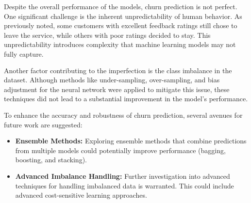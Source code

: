 \documentclass[12pt]{article}
\begin{document}
Despite the overall performance of the models, churn prediction is not perfect. One significant challenge is the inherent unpredictability of human behavior. As previously noted, some customers with excellent feedback ratings still chose to leave the service, while others with poor ratings decided to stay. This unpredictability introduces complexity that machine learning models may not fully capture.

Another factor contributing to the imperfection is the class imbalance in the dataset. Although methods like under-sampling, over-sampling, and bias adjustment for the neural network were applied to mitigate this issue, these techniques did not lead to a substantial improvement in the model's performance. 

To enhance the accuracy and robustness of churn prediction, several avenues for future work are suggested:
\begin{itemize}
    \item \textbf{Ensemble Methods:} Exploring ensemble methods that combine predictions from multiple models could potentially improve performance (bagging, boosting, and stacking).
    \item \textbf{Advanced Imbalance Handling:} Further investigation into advanced techniques for handling imbalanced data is warranted. This could include advanced cost-sensitive learning approaches.
\end{itemize}
\end{document}
